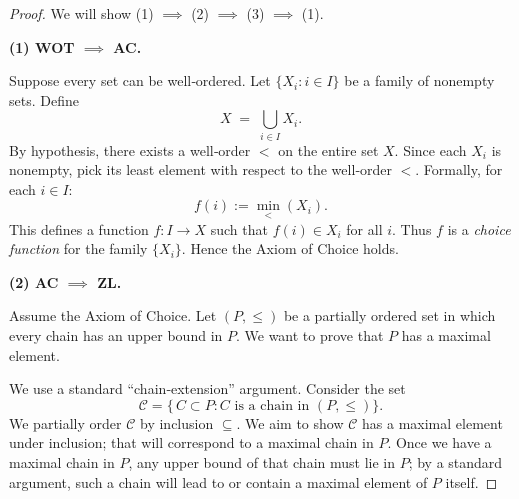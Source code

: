 \documentclass[12pt]{article}
\theoremstyle{definition} %
\theoremstyle{plain} %
\begin{document}
                                \begin{proof}
                                We will show (1) $\implies$ (2) $\implies$ (3) $\implies$ (1).
                                
                                \medskip
                                
                                \noindent
                                \textbf{(1) \;WOT $\implies$ AC.}
                                
                                Suppose every set can be well‐ordered. Let $\{X_i : i \in I\}$ be a family of nonempty sets. 
                                Define
                                \[
                                X \;=\; \bigcup_{i \in I} X_i.
                                \]
                                By hypothesis, there exists a well‐order $<$ on the entire set $X$. Since each $X_i$ is nonempty, pick its least element with respect to the well‐order $<$. Formally, for each $i \in I$:
                                \[
                                f(i) := \min_{<}(X_i).
                                \]
                                This defines a function $f: I \to X$ such that $f(i) \in X_i$ for all $i$. Thus $f$ is a \emph{choice function} for the family $\{X_i\}$. Hence the Axiom of Choice holds.
                                
                                \medskip
                                
                                \noindent
                                \textbf{(2) \;AC $\implies$ ZL.}
                                
                                Assume the Axiom of Choice. Let $(P,\le)$ be a partially ordered set in which every chain has an upper bound in $P$. We want to prove that $P$ has a maximal element.
                                
                                We use a standard “chain‐extension” argument. Consider the set 
                                \[
                                \mathcal{C} = \{\, C \subset P : C \text{ is a chain in }(P,\le) \}.
                                \]
                                We partially order $\mathcal{C}$ by inclusion $\subseteq$. We aim to show $\mathcal{C}$ has a maximal element under inclusion; that will correspond to a maximal chain in $P$. Once we have a maximal chain in $P$, any upper bound of that chain must lie in $P$; by a standard argument, such a chain will lead to or contain a maximal element of $P$ itself.
                                

\end{proof}
\end{document}
